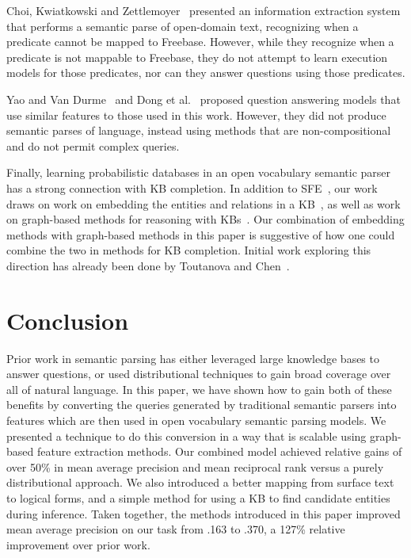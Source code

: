\documentclass[11pt,letterpaper]{article}
\begin{document}
Choi, Kwiatkowski and Zettlemoyer~
presented an information extraction system that performs a semantic parse of open-domain text,
recognizing when a predicate cannot be mapped to Freebase.  However, while they recognize when a
predicate is not mappable to Freebase, they do not attempt to learn execution models for those
predicates, nor can they answer questions using those predicates.

Yao and Van Durme~ and Dong et
al.~ proposed question answering models that use similar
features to those used in this work.  However, they did not produce semantic parses of language,
instead using methods that are non-compositional and do not permit complex queries.

Finally, learning probabilistic databases in an open vocabulary semantic parser has a strong
connection with KB completion.  In addition to SFE~\cite{gardner-2015-sfe}, our work draws on work
on embedding the entities and relations in a
KB~\cite{riedel-2013-mf-universal-schema,nickel-2011-rescal,%
bordes-2013-transe,nickel-2014-are,toutanova-2015-joint-text-kb-embedding}, as well as work on
graph-based methods for reasoning with
KBs~\cite{lao-2010-original-pra,gardner-2014-vector-space-pra,neelakantan-2015-rnn-kbc,%
bornea-2015-relational-path-mining}.  Our combination of embedding methods with graph-based methods
in this paper is suggestive of how one could combine the two in methods for KB completion.  Initial
work exploring this direction has already been done by Toutanova and
Chen~.


\section{Conclusion}
\label{sec:conclusion}

Prior work in semantic parsing has either leveraged large knowledge bases to answer questions, or
used distributional techniques to gain broad coverage over all of natural language.  In this paper,
we have shown how to gain both of these benefits by converting the queries generated by traditional
semantic parsers into features which are then used in open vocabulary semantic parsing models.  We
presented a technique to do this conversion in a way that is scalable using graph-based feature
extraction methods.  Our combined model achieved relative gains of over 50\% in mean average
precision and mean reciprocal rank versus a purely distributional approach.  We also introduced a
better mapping from surface text to logical forms, and a simple method for using a KB to find
candidate entities during inference.  Taken together, the methods introduced in this paper improved
mean average precision on our task from .163 to .370, a 127\% relative improvement over prior work.
\end{document}
